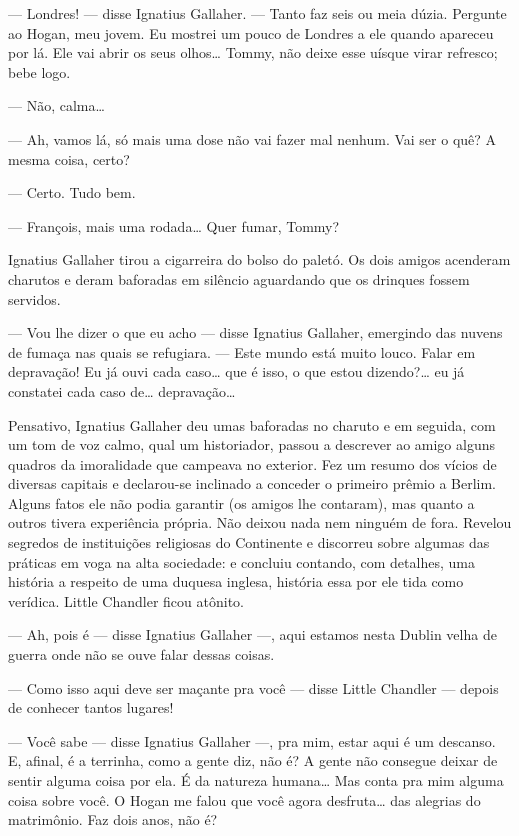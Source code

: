 --- Londres! --- disse Ignatius Gallaher.  --- Tanto faz seis ou meia dúzia.
Pergunte ao Hogan, meu jovem.  Eu mostrei um pouco de Londres a ele quando
apareceu por lá.  Ele vai abrir os seus olhos\ldots{}  Tommy, não deixe esse
uísque virar refresco; bebe logo.

--- Não, calma\ldots{}

--- Ah, vamos lá, só mais uma dose não vai fazer mal nenhum.  Vai ser o quê? A
mesma coisa, certo?

--- Certo.  Tudo bem.

--- François, mais uma rodada\ldots{} Quer fumar, Tommy?

Ignatius Gallaher tirou a cigarreira do bolso do paletó.  Os dois amigos
acenderam charutos e deram baforadas em silêncio aguardando que os drinques
fossem servidos.

--- Vou lhe dizer o que eu acho --- disse Ignatius Gallaher, emergindo das
nuvens de fumaça nas quais se refugiara.  --- Este mundo está muito louco.
Falar em depravação!  Eu já ouvi cada caso\ldots{} que é isso, o que estou
dizendo?\ldots{} eu já constatei cada caso de\ldots{} depravação\ldots{}

Pensativo, Ignatius Gallaher deu umas baforadas no charuto e em seguida, com um
tom de voz calmo, qual um historiador, passou a descrever ao amigo alguns
quadros da imoralidade que campeava no exterior.  Fez um resumo dos vícios de
diversas capitais e declarou-se inclinado a conceder o primeiro prêmio a
Berlim.  Alguns fatos ele não podia garantir (os amigos lhe contaram), mas
quanto a outros tivera experiência própria.  Não deixou nada nem ninguém de
fora.  Revelou segredos de instituições religiosas do Continente e discorreu
sobre algumas das práticas em voga na alta sociedade: e concluiu contando, com
detalhes, uma história a respeito de uma duquesa inglesa, história essa por ele
tida como verídica.  Little Chandler ficou atônito.

--- Ah, pois é --- disse Ignatius Gallaher ---, aqui estamos nesta Dublin velha
de guerra onde não se ouve falar dessas coisas.

--- Como isso aqui deve ser maçante pra você --- disse Little Chandler ---
depois de conhecer tantos lugares!

--- Você sabe --- disse Ignatius Gallaher ---, pra mim, estar aqui é um
descanso.  E, afinal, é a terrinha, como a gente diz, não é?  A gente não
consegue deixar de sentir alguma coisa por ela.  É da natureza humana\ldots{}
Mas conta pra mim alguma coisa sobre você.  O Hogan me falou que você agora
desfruta\ldots{} das alegrias do matrimônio.  Faz dois anos, não é?

